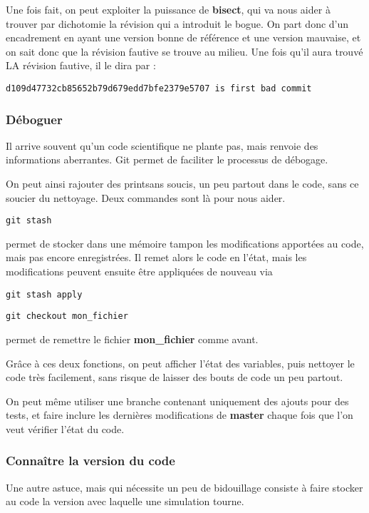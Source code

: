 Une fois fait, on peut exploiter la puissance de \textbf{bisect}, qui va nous aider à trouver par dichotomie la révision qui a introduit le bogue. On part donc d'un encadrement en ayant une version bonne de référence et une version mauvaise, et on sait donc que la révision fautive se trouve au milieu.
Une fois qu'il aura trouvé LA révision fautive, il le dira par :
\begin{verbatim}
d109d47732cb85652b79d679edd7bfe2379e5707 is first bad commit
\end{verbatim}


\subsubsection{Déboguer}
Il arrive souvent qu'un code scientifique ne plante pas, mais renvoie des informations aberrantes. Git permet de faciliter le processus de débogage. 

On peut ainsi rajouter des \og print\fg sans soucis, un peu partout dans le code, sans ce soucier du nettoyage. Deux commandes sont là pour nous aider. 

\begin{verbatim}
git stash
\end{verbatim}
permet de stocker dans une mémoire tampon les modifications apportées au code, mais pas encore enregistrées. Il remet alors le code en l'état, mais les modifications peuvent ensuite être appliquées de nouveau via 
\begin{verbatim}
git stash apply
\end{verbatim}

\bigskip

\begin{verbatim}
git checkout mon_fichier
\end{verbatim}
permet de remettre le fichier \textbf{mon\_fichier} comme avant. 

\bigskip

Grâce à ces deux fonctions, on peut afficher l'état des variables, puis nettoyer le code très facilement, sans risque de laisser des bouts de code un peu partout. 

On peut même utiliser une branche contenant uniquement des ajouts pour des tests, et faire inclure les dernières modifications de \textbf{master} chaque fois que l'on veut vérifier l'état du code. 

\subsubsection{Connaître la version du code} 
Une autre astuce, mais qui nécessite un peu de bidouillage consiste à faire stocker au code la version avec laquelle une simulation tourne. 

